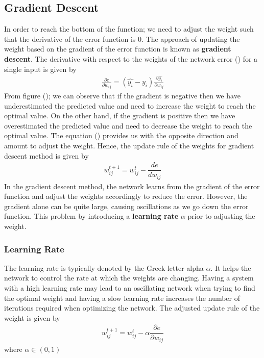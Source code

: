 \subsection*{Gradient Descent}
In order to reach the bottom of the function; we need to adjust the weight such that the derivative of the error function is 0. The approach of updating the weight based on the gradient of the error function is known as \textbf{gradient descent}. The derivative with respect to the weights of the network error () for a single input is given by
\begin{align}
  \frac{\partial e}{\partial w_{ij}} = (\widehat{y_i}-y_i)\frac{\partial \widehat{y_i}}{\partial w_{ij}}
  \label{derivative_network_error}
\end{align}
From figure (); we can observe that if the gradient is negative then we have underestimated the predicted value and need to increase the weight to reach the optimal value. On the other hand, if the gradient is positive then we have overestimated the predicted value and need to decrease the weight to reach the optimal value. The equation () provides us with the opposite direction and amount to adjust the weight. Hence, the update rule of the weights for gradient descent method is given by
\begin{align}
  w_{ij}^{t+1} = w_{ij}^{t} - \dfrac{de}{dw_{ij}}
\end{align}
In the gradient descent method, the network learns from the gradient of the error function and adjust the weights accordingly to reduce the error. However, the gradient alone can be quite large, causing oscillations as we go down the error function. This problem by introducing a \textbf{learning rate} $\alpha$ prior to adjusting the weight.
\subsubsection*{Learning Rate}
The learning rate is typically denoted by the Greek letter alpha $\alpha$. It helps the network to control the rate at which the weights are changing. Having a system with a high learning rate may lead to an oscillating network when trying to find the optimal weight and having a slow learning rate increases the number of iterations required when optimizing the network. The adjusted update rule of the weight is given by
\begin{align}
  w_{ij}^{t+1} = w_{ij}^{t} - \alpha\dfrac{\partial e}{\partial w_{ij}}
\end{align}
where $\alpha \in (0,1)$
